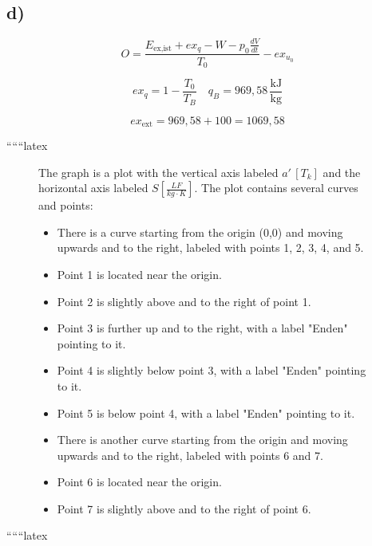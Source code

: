 

\subsection*{d)}

\[
O = \frac{E_{\text{ex,ist}} + ex_q - W - p_0 \frac{dV}{dt}}{T_0} - ex_{u_0}
\]

\[
ex_q = 1 - \frac{T_0}{T_B} \quad q_B = 969,58 \, \frac{\text{kJ}}{\text{kg}}
\]

\[
ex_{\text{ext}} = 969,58 + 100 = 1069,58
\]

``````latex


\begin{figure}[h]
    \centering
    The graph is a plot with the vertical axis labeled \( a' \, [T_k] \) and the horizontal axis labeled \( S \left[ \frac{L F}{kg \cdot K} \right] \). The plot contains several curves and points:
    \begin{itemize}
        \item There is a curve starting from the origin (0,0) and moving upwards and to the right, labeled with points 1, 2, 3, 4, and 5.
        \item Point 1 is located near the origin.
        \item Point 2 is slightly above and to the right of point 1.
        \item Point 3 is further up and to the right, with a label "Enden" pointing to it.
        \item Point 4 is slightly below point 3, with a label "Enden" pointing to it.
        \item Point 5 is below point 4, with a label "Enden" pointing to it.
        \item There is another curve starting from the origin and moving upwards and to the right, labeled with points 6 and 7.
        \item Point 6 is located near the origin.
        \item Point 7 is slightly above and to the right of point 6.
    \end{itemize}
\end{figure}

``````latex